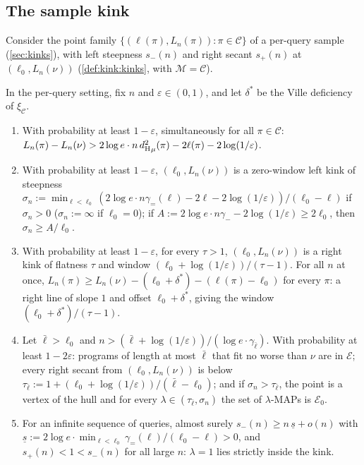 \subsection{The sample kink}\label{sec:recovery:kink}

Consider the point family $\{(\ell(\pi),L_n(\pi)):\pi\in\mathcal C\}$ of a per-query sample (\cref{sec:kinks}), with left steepness $s_-(n)$ and right secant $s_+(n)$ at $(\ell_0,L_n(\nu))$ (\cref{def:kink:kinks}, with $\mathcal M=\mathcal C$).

\begin{theorem}\label{thm:recovery:kink}
In the per-query setting, fix $n$ and $\varepsilon\in(0,1)$, and let $\delta^*$ be the Ville deficiency of $\xi_{\mathcal C}$.
\begin{enumerate}[label=(\roman*),itemsep=0pt,topsep=2pt]
\item With probability at least $1-\varepsilon$, simultaneously for all $\pi\in\mathcal C$: $L_n(\pi)-L_n(\nu)>2\log e\cdot n\,{d_{\mathrm{H}}^{2}}_\mu(\pi)-2\ell(\pi)-2\log(1/\varepsilon)$.
\item With probability at least $1-\varepsilon$, $(\ell_0,L_n(\nu))$ is a zero-window left kink of steepness $\sigma_n:=\min_{\ell<\ell_0}(2\log e\cdot n\gamma_=(\ell)-2\ell-2\log(1/\varepsilon))/(\ell_0-\ell)$ if $\sigma_n>0$ ($\sigma_n:=\infty$ if $\ell_0=0$); if $A:=2\log e\cdot n\gamma_--2\log(1/\varepsilon)\ge2\ell_0$, then $\sigma_n\ge A/\ell_0$.
\item With probability at least $1-\varepsilon$, for every $\tau>1$, $(\ell_0,L_n(\nu))$ is a right kink of flatness $\tau$ and window $(\ell_0+\log(1/\varepsilon))/(\tau-1)$. For all $n$ at once, $L_n(\pi)\ge L_n(\nu)-(\ell_0+\delta^*)-(\ell(\pi)-\ell_0)$ for every $\pi$: a right line of slope $1$ and offset $\ell_0+\delta^*$, giving the window $(\ell_0+\delta^*)/(\tau-1)$.
\item Let $\bar\ell>\ell_0$ and $n>(\bar\ell+\log(1/\varepsilon))/(\log e\cdot\gamma_{\bar\ell})$. With probability at least $1-2\varepsilon$: programs of length at most $\bar\ell$ that fit no worse than $\nu$ are in $\mathcal E$; every right secant from $(\ell_0,L_n(\nu))$ is below $\tau_{\bar\ell}:=1+(\ell_0+\log(1/\varepsilon))/(\bar\ell-\ell_0)$; and if $\sigma_n>\tau_{\bar\ell}$, the point is a vertex of the hull and for every $\lambda\in(\tau_{\bar\ell},\sigma_n)$ the set of $\lambda$-MAPs is $\mathcal E_0$.
\item For an infinite sequence of queries, almost surely $s_-(n)\ge n\,\underline s+o(n)$ with $\underline s:=2\log e\cdot\min_{\ell<\ell_0}\gamma_=(\ell)/(\ell_0-\ell)>0$, and $s_+(n)<1<s_-(n)$ for all large $n$: $\lambda=1$ lies strictly inside the kink.
\end{enumerate}
\end{theorem}

